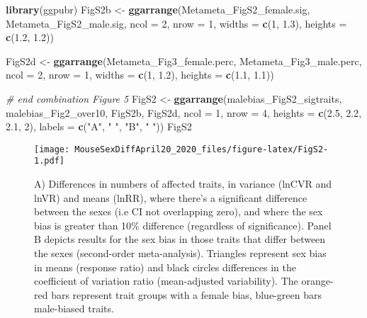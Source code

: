 \documentclass[]{article}
\newenvironment{Shaded}{\begin{snugshade}}{\end{snugshade}}
\newcommand{\CommentTok}[1]{\textcolor[rgb]{0.56,0.35,0.01}{\textit{#1}}}
\newcommand{\DataTypeTok}[1]{\textcolor[rgb]{0.13,0.29,0.53}{#1}}
\newcommand{\DecValTok}[1]{\textcolor[rgb]{0.00,0.00,0.81}{#1}}
\newcommand{\FloatTok}[1]{\textcolor[rgb]{0.00,0.00,0.81}{#1}}
\newcommand{\KeywordTok}[1]{\textcolor[rgb]{0.13,0.29,0.53}{\textbf{#1}}}
\newcommand{\NormalTok}[1]{#1}
\newcommand{\StringTok}[1]{\textcolor[rgb]{0.31,0.60,0.02}{#1}}
\begin{document}
\begin{Shaded}
\begin{Highlighting}[]
\KeywordTok{library}\NormalTok{(ggpubr)}
\NormalTok{FigS2b <-}\StringTok{ }\KeywordTok{ggarrange}\NormalTok{(Metameta_FigS2_female.sig, Metameta_FigS2_male.sig, }\DataTypeTok{ncol =} \DecValTok{2}\NormalTok{, }
    \DataTypeTok{nrow =} \DecValTok{1}\NormalTok{, }\DataTypeTok{widths =} \KeywordTok{c}\NormalTok{(}\DecValTok{1}\NormalTok{, }\FloatTok{1.3}\NormalTok{), }\DataTypeTok{heights =} \KeywordTok{c}\NormalTok{(}\FloatTok{1.2}\NormalTok{, }\FloatTok{1.2}\NormalTok{))}

\NormalTok{FigS2d <-}\StringTok{ }\KeywordTok{ggarrange}\NormalTok{(Metameta_Fig3_female.perc, Metameta_Fig3_male.perc, }\DataTypeTok{ncol =} \DecValTok{2}\NormalTok{, }
    \DataTypeTok{nrow =} \DecValTok{1}\NormalTok{, }\DataTypeTok{widths =} \KeywordTok{c}\NormalTok{(}\DecValTok{1}\NormalTok{, }\FloatTok{1.2}\NormalTok{), }\DataTypeTok{heights =} \KeywordTok{c}\NormalTok{(}\FloatTok{1.1}\NormalTok{, }\FloatTok{1.1}\NormalTok{))}

\CommentTok{# end combination Figure 5}
\NormalTok{FigS2 <-}\StringTok{ }\KeywordTok{ggarrange}\NormalTok{(malebias_FigS2_sigtraits, malebias_Fig2_over10, FigS2b, FigS2d, }
    \DataTypeTok{ncol =} \DecValTok{1}\NormalTok{, }\DataTypeTok{nrow =} \DecValTok{4}\NormalTok{, }\DataTypeTok{heights =} \KeywordTok{c}\NormalTok{(}\FloatTok{2.5}\NormalTok{, }\FloatTok{2.2}\NormalTok{, }\FloatTok{2.1}\NormalTok{, }\DecValTok{2}\NormalTok{), }\DataTypeTok{labels =} \KeywordTok{c}\NormalTok{(}\StringTok{"A"}\NormalTok{, }\StringTok{" "}\NormalTok{, }\StringTok{"B"}\NormalTok{, }
        \StringTok{" "}\NormalTok{))}
\NormalTok{FigS2}
\end{Highlighting}
\end{Shaded}

\begin{figure}
\centering
\texttt{[image: MouseSexDiffApril20\_2020\_files/figure-latex/FigS2-1.pdf]}
\caption{A) Differences in numbers of affected traits, in variance
(lnCVR and lnVR) and means (lnRR), where there's a significant
difference between the sexes (i.e CI not overlapping zero), and where
the sex bias is greater than 10\% difference (regardless of
significance). Panel B depicts results for the sex bias in those traits
that differ between the sexes (second-order meta-analysis). Triangles
represent sex bias in means (response ratio) and black circles
differences in the coefficient of variation ratio (mean-adjusted
variability). The orange-red bars represent trait groups with a female
bias, blue-green bars male-biased traits.}
\end{figure}
\end{document}
